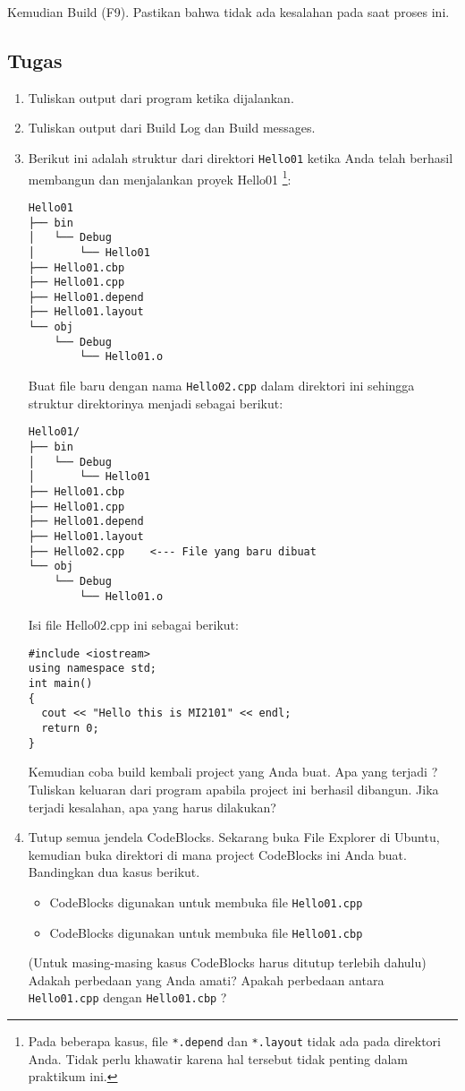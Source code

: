 \documentclass[a4paper,11pt]{extarticle}
\begin{document}
Kemudian \textsf{Build (F9)}. Pastikan bahwa tidak ada kesalahan pada saat proses ini.

\subsection{Tugas}

\begin{enumerate}
\item Tuliskan output dari program ketika dijalankan.
%
\item Tuliskan output dari \textsf{Build Log} dan \textsf{Build messages}.
%
\item Berikut ini adalah struktur dari direktori \texttt{Hello01} ketika Anda
      telah berhasil membangun dan menjalankan proyek \textsf{Hello01}
      \footnote{Pada beberapa kasus, file \texttt{*.depend} dan \texttt{*.layout} tidak
      ada pada direktori Anda. Tidak perlu khawatir karena hal tersebut tidak penting
      dalam praktikum ini.}:
%
\begin{verbatim}
Hello01
├── bin
│   └── Debug
│       └── Hello01
├── Hello01.cbp
├── Hello01.cpp
├── Hello01.depend
├── Hello01.layout
└── obj
    └── Debug
        └── Hello01.o
\end{verbatim}
   Buat file baru dengan nama \texttt{Hello02.cpp} dalam direktori ini sehingga
   struktur direktorinya menjadi sebagai berikut:
%
\begin{verbatim}
Hello01/
├── bin
│   └── Debug
│       └── Hello01
├── Hello01.cbp
├── Hello01.cpp
├── Hello01.depend
├── Hello01.layout
├── Hello02.cpp    <--- File yang baru dibuat
└── obj
    └── Debug
        └── Hello01.o
\end{verbatim}
%
  Isi file \textsf{Hello02.cpp} ini sebagai berikut:
%
\begin{verbatim}
#include <iostream>
using namespace std;
int main()
{
  cout << "Hello this is MI2101" << endl;
  return 0;
}
\end{verbatim}
%
   Kemudian coba build kembali project yang Anda buat. Apa yang terjadi ?
   Tuliskan keluaran dari program apabila project ini berhasil dibangun.
   Jika terjadi kesalahan, apa yang harus dilakukan?
%
\item Tutup semua jendela CodeBlocks.
      Sekarang buka File Explorer di Ubuntu, kemudian buka direktori di mana
      project CodeBlocks ini Anda buat.
      Bandingkan dua kasus berikut.
      \begin{itemize}  
      \item CodeBlocks digunakan untuk membuka file \texttt{Hello01.cpp}
      \item CodeBlocks digunakan untuk membuka file \texttt{Hello01.cbp}
      \end{itemize}
      (Untuk masing-masing kasus CodeBlocks harus ditutup terlebih dahulu)
      Adakah perbedaan yang Anda amati? Apakah perbedaan antara \texttt{Hello01.cpp}
      dengan \texttt{Hello01.cbp} ?

\end{enumerate}
\end{document}
